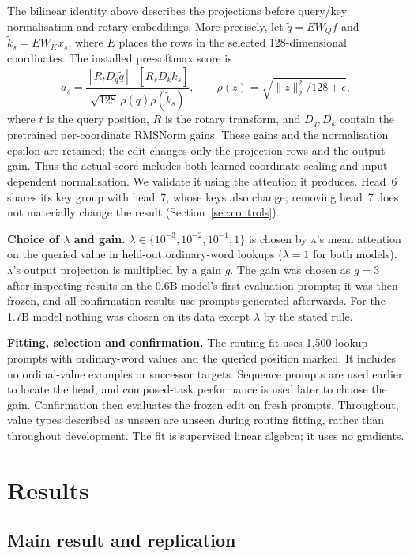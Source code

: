 \documentclass[11pt]{article}
\newcommand{\A}{\textsc{a}}
\begin{document}
The bilinear identity above describes the projections before query/key normalisation and rotary embeddings. More precisely, let $\tilde q=E W_Q f$ and $\tilde k_s=E W_K x_s$, where $E$ places the rows in the selected 128-dimensional coordinates. The installed pre-softmax score is
\begin{equation}
 a_s=\frac{[R_t D_q\tilde q]^{\top}[R_s D_k\tilde k_s]}
 {\sqrt{128}\,\rho(\tilde q)\rho(\tilde k_s)},\qquad
 \rho(z)=\sqrt{\|z\|_2^2/128+\epsilon},
\end{equation}
where $t$ is the query position, $R$ is the rotary transform, and $D_q,D_k$ contain the pretrained per-coordinate RMSNorm gains. These gains and the normalisation epsilon are retained; the edit changes only the projection rows and the output gain. Thus the actual score includes both learned coordinate scaling and input-dependent normalisation. We validate it using the attention it produces. Head~6 shares its key group with head~7, whose keys also change; removing head~7 does not materially change the result (Section~\ref{sec:controls}).

\textbf{Choice of $\lambda$ and gain.} $\lambda \in \{10^{-3},10^{-2},10^{-1},1\}$ is chosen by \A's mean attention on the queried value in held-out ordinary-word lookups ($\lambda = 1$ for both models). \A's output projection is multiplied by a gain $g$. The gain was chosen as $g=3$ after inspecting results on the 0.6B model's first evaluation prompts; it was then frozen, and all confirmation results use prompts generated afterwards. For the 1.7B model nothing was chosen on its data except $\lambda$ by the stated rule.

\textbf{Fitting, selection and confirmation.} The routing fit uses 1{,}500 lookup prompts with ordinary-word values and the queried position marked. It includes no ordinal-value examples or successor targets. Sequence prompts are used earlier to locate the head, and composed-task performance is used later to choose the gain. Confirmation then evaluates the frozen edit on fresh prompts. Throughout, value types described as unseen are unseen during routing fitting, rather than throughout development. The fit is supervised linear algebra; it uses no gradients.

\section{Results}\label{sec:results}

\subsection{Main result and replication}\label{sec:main}
\end{document}
